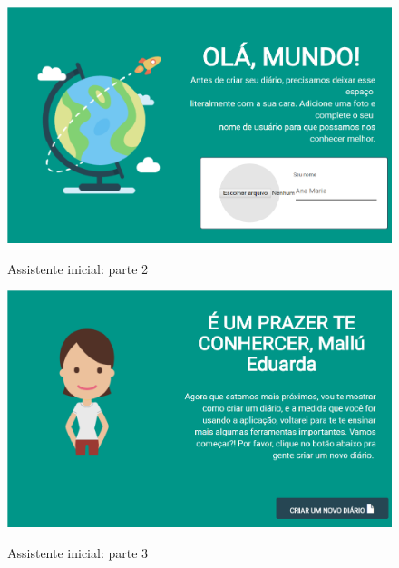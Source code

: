 \begin{figure}[!htb]
	\centering
	\caption{Assistente inicial: parte 2} %
	\includegraphics[scale=0.4]{assistenteInicialPT2}\\  %
	{\small } %
	\label{fig:assistenteInicialPT2} %
\end{figure}

\begin{figure}[!htb]
	\centering
	\caption{Assistente inicial: parte 3} %
	\includegraphics[scale=0.4]{assistenteInicialPT3}\\  %
	{\small } %
	\label{fig:assistenteInicialPT3} %
\end{figure}


